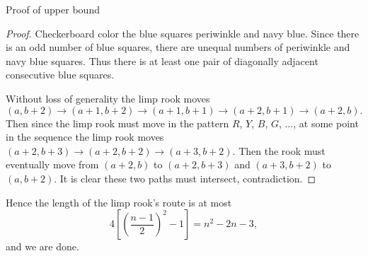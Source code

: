 \begin{customenv}{Proof of upper bound}
\begin{proof}
        Checkerboard color the blue squares periwinkle and navy blue. Since there is an odd number of blue squares, there are unequal numbers of periwinkle and navy blue squares. Thus there is at least one pair of diagonally adjacent consecutive blue squares.
        \begin{center}
        \end{center}
        Without loss of generality the limp rook moves \[(a,b+2)\to(a+1,b+2)\to(a+1,b+1)\to(a+2,b+1)\to(a+2,b).\]
        Then since the limp rook must move in the pattern $R$, $Y$, $B$, $G$, $\ldots$, at some point in the sequence the limp rook moves $(a+2,b+3)\to(a+2,b+2)\to(a+3,b+2)$. Then the rook must eventually move from $(a+2,b)$ to $(a+2,b+3)$ and $(a+3,b+2)$ to $(a,b+2)$. It is clear these two paths must intersect, contradiction.
    \end{proof}

    Hence the length of the limp rook's route is at most \[4\left[\left(\frac{n-1}2\right)^2-1\right]=n^2-2n-3,\]
    and we are done.
\end{customenv}

